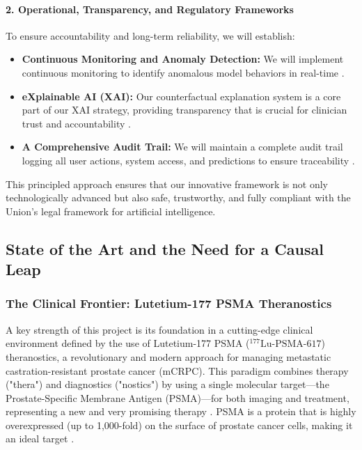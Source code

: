 \documentclass[11pt, a4paper]{article}
\begin{document}
\begin{itemize}
\paragraph{2. Operational, Transparency, and Regulatory Frameworks}
To ensure accountability and long-term reliability, we will establish:
\begin{itemize}
    \item \textbf{Continuous Monitoring and Anomaly Detection:} We will implement continuous monitoring to identify anomalous model behaviors in real-time \cite{AlAttar2023,GarcaGmezBlanesSelva2023}.
    \item \textbf{eXplainable AI (XAI):} Our counterfactual explanation system is a core part of our XAI strategy, providing transparency that is crucial for clinician trust and accountability \cite{GarcaGmezBlanesSelva2023,JamesIjiga2024}.
    \item \textbf{A Comprehensive Audit Trail:} We will maintain a complete audit trail logging all user actions, system access, and predictions to ensure traceability \cite{GarcaGmezBlanesSelva2023,KhadkaEpiphaniou2025}.
\end{itemize}
\end{itemize}

This principled approach ensures that our innovative framework is not only technologically advanced but also safe, trustworthy, and fully compliant with the Union's legal framework for artificial intelligence.


\subsection{State of the Art and the Need for a Causal Leap}
\subsubsection{The Clinical Frontier: Lutetium-177 PSMA Theranostics}
A key strength of this project is its foundation in a cutting-edge clinical environment defined by the use of Lutetium-177 PSMA (${}^{177}\text{Lu-PSMA-617}$) theranostics, a revolutionary and modern approach for managing metastatic castration-resistant prostate cancer (mCRPC). This paradigm combines therapy ("thera") and diagnostics ("nostics") by using a single molecular target—the Prostate-Specific Membrane Antigen (PSMA)—for both imaging and treatment, representing a new and very promising therapy \cite{HennrichEder2022}. PSMA is a protein that is highly overexpressed (up to 1,000-fold) on the surface of prostate cancer cells, making it an ideal target \cite{HennrichEder2022, LingBlois2022}.
\end{document}
